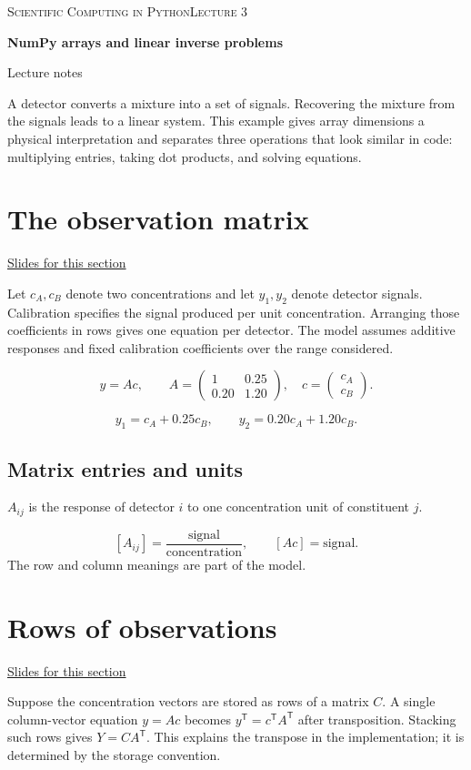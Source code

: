 \documentclass[11pt,letterpaper]{article}
\theoremstyle{definition}\newtheorem{definition}{Definition}\newtheorem{example}{Example}
\numberwithin{equation}{section}
\begin{document}
{\small\scshape Scientific Computing in Python\hfill Lecture 3}\par\medskip
{\raggedright{}\LARGE\bfseries\color{ink} NumPy arrays and linear inverse problems\par}\medskip
{\small Lecture notes}\par\bigskip
A detector converts a mixture into a set of signals. Recovering the mixture from the signals leads to a linear system. This example gives array dimensions a physical interpretation and separates three operations that look similar in code: multiplying entries, taking dot products, and solving equations.

\section{The observation matrix}
\hypertarget{note-the-observation-matrix}{}\label{note:the-observation-matrix}
{\small \href{slides.html\#frame=the-observation-matrix\&step=1}{Slides for this section}}\par
Let $c_A,c_B$ denote two concentrations and let $y_1,y_2$ denote detector signals. Calibration specifies the signal produced per unit concentration. Arranging those coefficients in rows gives one equation per detector. The model assumes additive responses and fixed calibration coefficients over the range considered.

\[
y=Ac,\qquad A=\begin{pmatrix}1&0.25\\0.20&1.20\end{pmatrix},\quad c=\begin{pmatrix}c_A\\c_B\end{pmatrix}.
\]

\[
y_1=c_A+0.25c_B,\qquad y_2=0.20c_A+1.20c_B.
\]

\subsection*{Matrix entries and units}
$A_{ij}$ is the response of detector $i$ to one concentration unit of constituent $j$.

\[
[A_{ij}]=\frac{\text{signal}}{\text{concentration}},\qquad [Ac]=\text{signal}.
\]
The row and column meanings are part of the model.
\section{Rows of observations}
\hypertarget{note-rows-of-observations}{}\label{note:rows-of-observations}
{\small \href{slides.html\#frame=rows-of-observations\&step=1}{Slides for this section}}\par
Suppose the concentration vectors are stored as rows of a matrix $C$. A single column-vector equation $y=Ac$ becomes $y^{\mathsf T}=c^{\mathsf T}A^{\mathsf T}$ after transposition. Stacking such rows gives $Y=CA^{\mathsf T}$. This explains the transpose in the implementation; it is determined by the storage convention.
\end{document}
